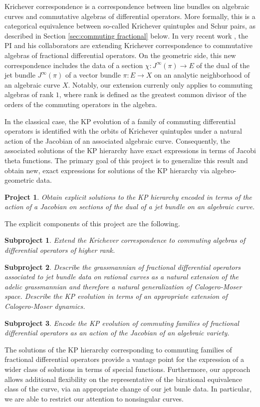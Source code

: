 \documentclass[11pt,letterpaper]{article}
\newtheorem{goal}{Project}
\newtheorem{subgoal}{Subproject}[goal]
\theoremstyle{definition}
\begin{document}
Krichever correspondence is a correspondence between line bundles on algebraic curves and commutative algebras of differential operators.   More formally, this is a categorical equivalence between so-called Krichever quintuples and Schur pairs, as described in Section \ref{sec:commuting fractional} below.  In very recent work \cite{CHIY}, the PI and his collaborators are extending Krichever correspondence to commutative algebras of fractional differential operators.  On the geometric side, this new correspondence includes the data of a section $\chi: J^\infty(\pi)\rightarrow E$ of the dual of the jet bundle $J^\infty(\pi)$ of a vector bundle $\pi: E\rightarrow X$ on an analytic neighborhood of an algebraic curve $X$.
Notably, our extension currenly only applies to commuting algebras of rank $1$, where rank is defined as the greatest common divisor of the orders of the commuting operators in the algebra.

In the classical case, the KP evolution of a family of commuting differential operators is identified with the orbits of Krichever quintuples under a natural action of the Jacobian of an associated algebraic curve.
Consequently, the associated solutions of the KP hierarchy have exact expressions in terms of Jacobi theta functions.
The primary goal of this project is to generalize this result and obtain new, exact expressions for solutions of the KP hierarchy via algebro-geometric data.
\begin{goal}
Obtain explicit solutions to the KP hierarchy encoded in terms of the action of a Jacobian on sections of the dual of a jet bundle on an algebraic curve.
\end{goal}
\noindent The explicit components of this project are the following.
\begin{subgoal}
Extend the Krichever correspondence to commuting algebras of differential operators of higher rank.
\end{subgoal}
\begin{subgoal}
Describe the grassmannian of fractional differential operators associated to jet bundle data on rational curves as a natural extension of the adelic grassmannian and therefore a natural generalization of Calogero-Moser space.
Describe the KP evolution in terms of an appropriate extension of Calogero-Moser dynamics.
\end{subgoal}
\begin{subgoal} 
Encode the KP evolution of commuting families of fractional differential operators as an action of the Jacobian of an algebraic variety.
\end{subgoal}
The solutions of the KP hierarchy corresponding to commuting families of fractional differential operators provide a vantage point for the expression of a wider class of solutions in terms of special functions.
Furthermore, our approach allows additional flexibility on the representative of the birational equivalence class of the curve, via an appropriate change of our jet bunle data.
In particular, we are able to restrict our attention to nonsingular curves.
\end{document}
